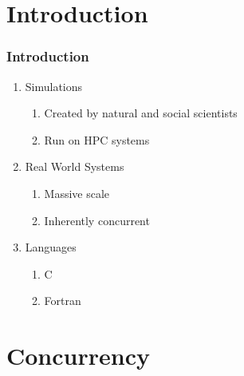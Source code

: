 \section{Introduction}
\begin{frame}
  \frametitle{Introduction}
  \begin{enumerate}
    \item Simulations
    \begin{enumerate}
      \item Created by natural and social scientists
      \item Run on HPC systems
    \end{enumerate}
    \item Real World Systems
    \begin{enumerate}
      \item Massive scale
      \item Inherently concurrent
    \end{enumerate}
    \item Languages
    \begin{enumerate}
      \item C
      \item Fortran
    \end{enumerate}
  \end{enumerate}
\end{frame}

\section{Concurrency}
